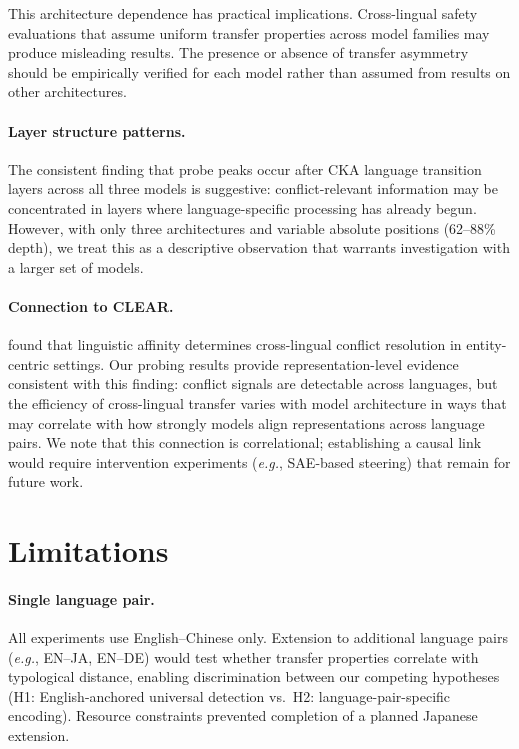 \documentclass[11pt]{article}
\newcommand{\eg}{\textit{e.g.}}
\begin{document}
This architecture dependence has practical implications.
Cross-lingual safety evaluations that assume uniform transfer properties across model families may produce misleading results.
The presence or absence of transfer asymmetry should be empirically verified for each model rather than assumed from results on other architectures.

\paragraph{Layer structure patterns.}
The consistent finding that probe peaks occur after CKA language transition layers across all three models is suggestive: conflict-relevant information may be concentrated in layers where language-specific processing has already begun.
However, with only three architectures and variable absolute positions (62--88\% depth), we treat this as a descriptive observation that warrants investigation with a larger set of models.

\paragraph{Connection to CLEAR.}
\citet{zhao2026clear} found that linguistic affinity determines cross-lingual conflict resolution in entity-centric settings.
Our probing results provide representation-level evidence consistent with this finding: conflict signals are detectable across languages, but the efficiency of cross-lingual transfer varies with model architecture in ways that may correlate with how strongly models align representations across language pairs.
We note that this connection is correlational; establishing a causal link would require intervention experiments (\eg, SAE-based steering) that remain for future work.

\section{Limitations}
\label{sec:limitations}

\paragraph{Single language pair.}
All experiments use English--Chinese only.
Extension to additional language pairs (\eg, EN--JA, EN--DE) would test whether transfer properties correlate with typological distance, enabling discrimination between our competing hypotheses (H1: English-anchored universal detection vs.\ H2: language-pair-specific encoding).
Resource constraints prevented completion of a planned Japanese extension.
\end{document}
